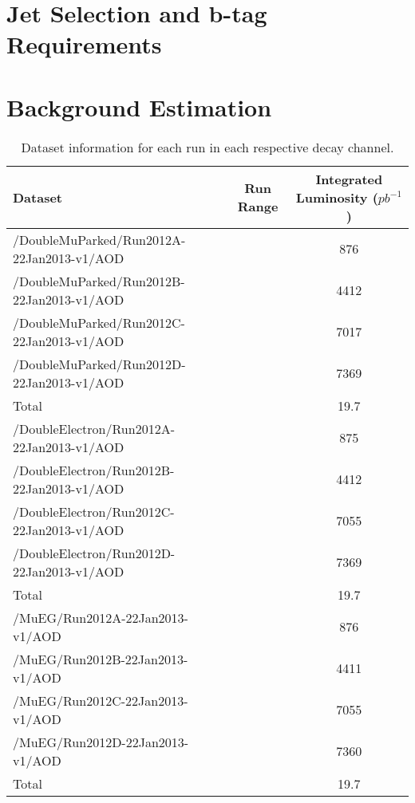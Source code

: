 \section{Jet Selection and b-tag Requirements}

\section{Background Estimation}


\begin{sidewaystable} \label{tab-datasets}
\begin{center}
\begin{tabular}{|l|c|c|}
\hline
	\textbf{Dataset} & \textbf{Run Range} & \textbf{Integrated Luminosity ($pb^{-1}$)}\\
\hline
	/DoubleMuParked/Run2012A-22Jan2013-v1/AOD &  & 876 \\
	/DoubleMuParked/Run2012B-22Jan2013-v1/AOD &  & 4412 \\
	/DoubleMuParked/Run2012C-22Jan2013-v1/AOD &  & 7017 \\
	/DoubleMuParked/Run2012D-22Jan2013-v1/AOD &  & 7369 \\
\hline
	Total & & 19.7\\	
\hline
	/DoubleElectron/Run2012A-22Jan2013-v1/AOD &  & 875 \\
	/DoubleElectron/Run2012B-22Jan2013-v1/AOD &  & 4412 \\
	/DoubleElectron/Run2012C-22Jan2013-v1/AOD &  & 7055 \\
	/DoubleElectron/Run2012D-22Jan2013-v1/AOD &  & 7369 \\
\hline
	Total & & 19.7\\	
\hline
	/MuEG/Run2012A-22Jan2013-v1/AOD &  & 876 \\
	/MuEG/Run2012B-22Jan2013-v1/AOD &  & 4411 \\
	/MuEG/Run2012C-22Jan2013-v1/AOD &  & 7055 \\
	/MuEG/Run2012D-22Jan2013-v1/AOD &  & 7360 \\
\hline
	Total & & 19.7\\	
\hline	
\end{tabular}	
\caption{Dataset information for each run in each respective decay channel.}
\end{center}
\end{sidewaystable}

